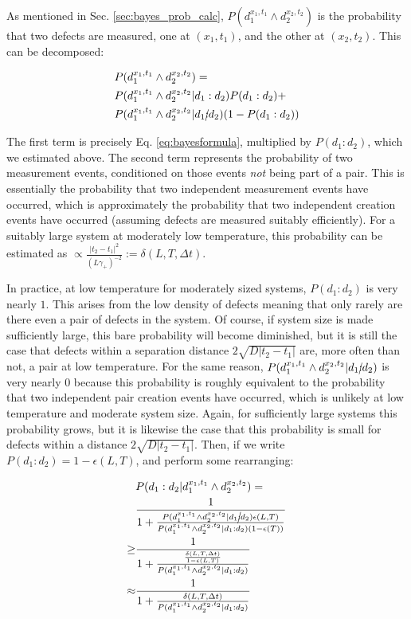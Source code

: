 \documentclass[twocolumn,superscriptaddress,aps,prb,floatfix]{revtex4-1}
\renewcommand*{\emph}[1]{{\it {#1}}}
\begin{document}
As mentioned in Sec. \ref{sec:bayes_prob_calc}, $P(d_1^{x_1,t_1}\wedge d_2^{x_2,t_2})$ is the probability that two defects are measured, one at $(x_1,t_1)$, and the other at $(x_2,t_2)$.  This can be decomposed:

\begin{align}
&P(d_1^{x_1,t_1}\wedge d_2^{x_2,t_2}) = \\ \notag
&P(d_1^{x_1,t_1} \wedge d_2^{x_2,t_2} | d_1:d_2) P(d_1 : d_2) + \\ \notag 
&P(d_1^{x_1,t_1} \wedge d_2^{x_2,t_2} | d_1\cancel{:}d_2) (1 - P(d_1 : d_2))
\end{align}

The first term is precisely Eq. \ref{eq:bayesformula}, multiplied by $P(d_1 : d_2)$, which we estimated above.  The second term represents the probability of two measurement events, conditioned on those events \emph{not} being part of a pair.  This is essentially the probability that two independent measurement events have occurred, which is approximately the probability that two independent creation events have occurred (assuming defects are measured suitably efficiently).  For a suitably large system at moderately low temperature, this probability can be estimated as $\propto \frac{|t_2-t_1|^2}{(L \gamma_+)^{-2}}:=\delta(L,T,\Delta t)$.

In practice, at low temperature for moderately sized systems, $P(d_1 : d_2)$ is very nearly $1$.  This arises from the low density of defects meaning that only rarely are there even a pair of defects in the system.  Of course, if system size is made sufficiently large, this bare probability will become diminished, but it is still the case that defects within a separation distance $2\sqrt{D |t_2 - t_1|}$ are, more often than not, a pair at low temperature.  For the same reason, $P(d_1^{x_1,t_1} \wedge d_2^{x_2,t_2} | d_1\cancel{:}d_2)$ is very nearly $0$ because this probability is roughly equivalent to the probability that two independent pair creation events have occurred, which is unlikely at low temperature and moderate system size.  Again, for sufficiently large systems this probability grows, but it is likewise the case that this probability is small for defects within a distance $2\sqrt{D |t_2 - t_1|}$.  Then, if we write $P(d_1 : d_2) = 1 - \epsilon(L,T)$, and perform some rearranging:

\begin{align}
\label{eq:bayes_simple}
&P(d_1:d_2 | d_1^{x_1,t_1} \wedge d_2^{x_2,t_2}) = \\ \notag
&\frac{1}{1+\frac{P(d_1^{x_1,t_1} \wedge d_2^{x_2,t_2} | d_1\cancel{:}d_2) \epsilon(L,T)}{P(d_1^{x_1,t_1} \wedge d_2^{x_2,t_2} | d_1:d_2) (1-\epsilon(T))}} \\ \notag
\geq &\frac{1}{1+\frac{\frac{\delta(L,T,\Delta t)}{1-\epsilon(L,T)}} {P(d_1^{x_1,t_1} \wedge d_2^{x_2,t_2} | d_1:d_2)}} \\ \notag
\approx &\frac{1}{1+\frac{\delta(L,T,\Delta t)}{P(d_1^{x_1,t_1} \wedge d_2^{x_2,t_2} | d_1:d_2)}}
\end{align}
\end{document}
